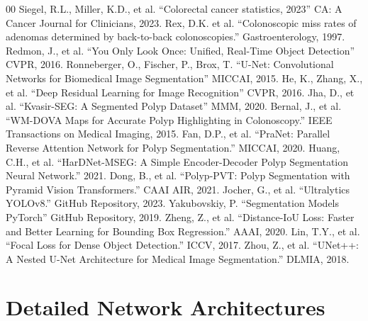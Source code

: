\documentclass[runningheads]{llncs}
\begin{document}
\begin{thebibliography}{00}
 Siegel, R.L., Miller, K.D., et al. ``Colorectal cancer statistics, 2023'' CA: A Cancer Journal for Clinicians, 2023.
 Rex, D.K. et al. ``Colonoscopic miss rates of adenomas determined by back-to-back colonoscopies.'' Gastroenterology, 1997.
 Redmon, J., et al. ``You Only Look Once: Unified, Real-Time Object Detection'' CVPR, 2016.
 Ronneberger, O., Fischer, P., Brox, T. ``U-Net: Convolutional Networks for Biomedical Image Segmentation'' MICCAI, 2015.
 He, K., Zhang, X., et al. ``Deep Residual Learning for Image Recognition'' CVPR, 2016.
 Jha, D., et al. ``Kvasir-SEG: A Segmented Polyp Dataset'' MMM, 2020.
 Bernal, J., et al. ``WM-DOVA Maps for Accurate Polyp Highlighting in Colonoscopy.'' IEEE Transactions on Medical Imaging, 2015.
 Fan, D.P., et al. ``PraNet: Parallel Reverse Attention Network for Polyp Segmentation.'' MICCAI, 2020.
 Huang, C.H., et al. ``HarDNet-MSEG: A Simple Encoder-Decoder Polyp Segmentation Neural Network.'' 2021.
 Dong, B., et al. ``Polyp-PVT: Polyp Segmentation with Pyramid Vision Transformers.'' CAAI AIR, 2021.
 Jocher, G., et al. ``Ultralytics YOLOv8.'' GitHub Repository, 2023.
 Yakubovskiy, P. ``Segmentation Models PyTorch'' GitHub Repository, 2019.
 Zheng, Z., et al. ``Distance-IoU Loss: Faster and Better Learning for Bounding Box Regression.'' AAAI, 2020.
 Lin, T.Y., et al. ``Focal Loss for Dense Object Detection.'' ICCV, 2017.
 Zhou, Z., et al. ``UNet++: A Nested U-Net Architecture for Medical Image Segmentation.'' DLMIA, 2018.
\end{thebibliography}

\appendix

\section{Detailed Network Architectures}
\end{document}
